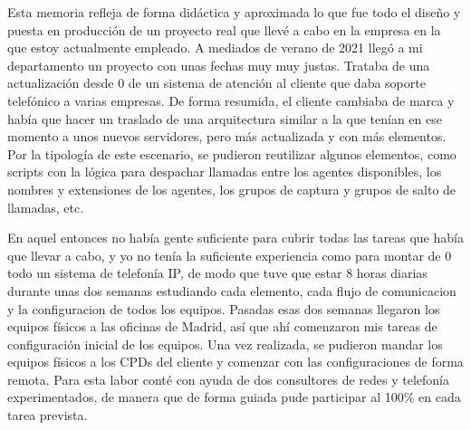 \documentclass[a4paper, 12pt]{book}
\begin{document}
Esta memoria refleja de forma didáctica y aproximada lo que fue todo el diseño y puesta en producción de un proyecto real que llevé a cabo en la empresa en la que estoy actualmente empleado. 
A mediados de verano de 2021 llegó a mi departamento un proyecto con unas fechas muy muy justas. Trataba de una actualización desde 0 de un sistema de atención al cliente que daba soporte telefónico a varias empresas. De forma resumida, el cliente cambiaba de marca y había que hacer un traslado de una arquitectura similar a la que tenían en ese momento a unos nuevos servidores, pero más actualizada y con más elementos. Por la tipología de este escenario, se pudieron reutilizar algunos elementos, como scripts con la lógica para despachar llamadas entre los agentes disponibles, los nombres y extensiones de los agentes, los grupos de captura y grupos de salto de llamadas, etc.

En aquel entonces no había gente suficiente para cubrir todas las tareas que había que llevar a cabo, y yo no tenía la suficiente experiencia como para montar de 0 todo un sistema de telefonía IP, de modo que tuve que estar 8 horas diarias durante unas dos semanas estudiando cada elemento, cada flujo de comunicacion y la configuracion de todos los equipos. Pasadas esas dos semanas llegaron los equipos físicos a las oficinas de Madrid, así que ahí comenzaron mis tareas de configuración inicial de los equipos. 
Una vez realizada, se pudieron mandar los equipos físicos a los CPDs del cliente y comenzar con las configuraciones de forma remota. Para esta labor conté con ayuda de dos consultores de redes y telefonía experimentados, de manera que de forma guiada pude participar al 100\% en cada tarea prevista.
\end{document}
